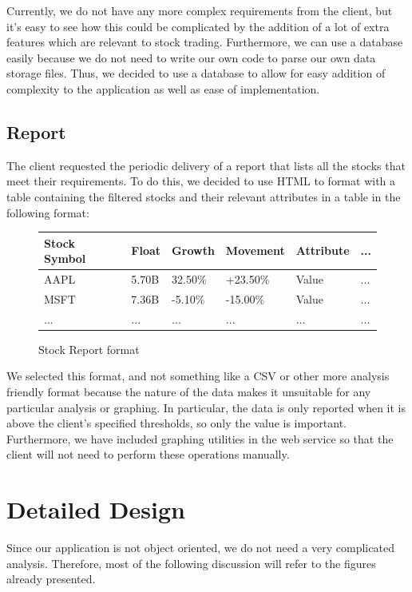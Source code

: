 \documentclass[12pt,a4paper]{article}
\begin{document}
Currently, we do not have any more complex requirements from the client, but it's easy to see how this could be complicated by the addition of a lot of extra features which are relevant to stock trading. Furthermore, we can use a database easily because we do not need to write our own code to parse our own data storage files. Thus, we decided to use a database to allow for easy addition of complexity to the application as well as ease of implementation.

\subsection{Report}

The client requested the periodic delivery of a report that lists all the stocks that meet their requirements. To do this, we decided to use HTML to format with a table containing the filtered stocks and their relevant attributes in a table in the following format:

\begin{figure}[h!]
\centering
    \begin{tabular}{ | l | l | l | l | l | l |}
    \hline
    Stock Symbol & Float & Growth & Movement & Attribute & ... \\ \hline
    AAPL & 5.70B & 32.50\% & +23.50\% & Value & ...\\ \hline
    MSFT & 7.36B & -5.10\% & -15.00\% & Value & ... \\ \hline
    ... & ... & ... & ... & ... & ...\\ \hline
    \end{tabular}
\caption{Stock Report format}
\end{figure}

We selected this format, and not something like a CSV or other more analysis friendly format because the nature of the data makes it unsuitable for any particular analysis or graphing. In particular, the data is only reported when it is above the client's specified thresholds, so only the value is important. Furthermore, we have included graphing utilities in the web service so that the client will not need to perform these operations manually.

\section{Detailed Design}

Since our application is not object oriented, we do not need a very complicated analysis. Therefore, most of the following discussion will refer to the figures already presented. 
\end{document}
